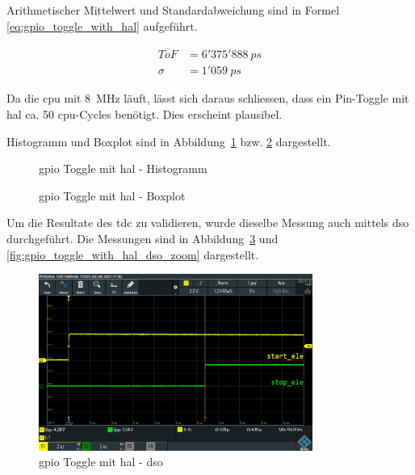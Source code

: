 Arithmetischer Mittelwert und Standardabweichung sind in Formel \ref{eq:gpio_toggle_with_hal} aufgeführt.

\begin{equation}\label{eq:gpio_toggle_with_hal}
    \begin{split}
        \overline{ToF} &= 6'375'888~ps\\
        \sigma         &= 1'059~ps
    \end{split}
\end{equation}

Da die \acrshort{cpu} mit 8~MHz läuft, lässt sich daraus schliessen, dass ein Pin-Toggle mit \acrshort{hal} ca. 50
\acrshort{cpu}-Cycles benötigt. Dies erscheint plausibel.

Histogramm und Boxplot sind in Abbildung~\ref{fig:gpio_toggle_with_hal_histogram} bzw.
\ref{fig:gpio_toggle_with_hal_boxplot} dargestellt.

\begin{figure}[H]
    \centering
    
    \caption{\acrshort{gpio} Toggle mit \acrshort{hal} - Histogramm}\label{fig:gpio_toggle_with_hal_histogram}
\end{figure}

\begin{figure}[H]
    \centering
    
    \caption{\acrshort{gpio} Toggle mit \acrshort{hal} - Boxplot}\label{fig:gpio_toggle_with_hal_boxplot}
\end{figure}

Um die Resultate des \acrshort{tdc} zu validieren, wurde dieselbe Messung auch mittels \acrfull{dso} durchgeführt. Die
Messungen sind in Abbildung~\ref{fig:gpio_toggle_with_hal_dso} und \ref{fig:gpio_toggle_with_hal_dso_zoom} dargestellt.

\begin{figure}[H]
    \centering
    \includegraphics[width=0.8\textwidth]{graphics/gpio_toggle_with_hal_dso.png}
    \caption{\acrshort{gpio} Toggle mit \acrshort{hal} - \acrshort{dso}}\label{fig:gpio_toggle_with_hal_dso}
\end{figure}

